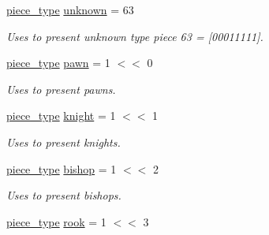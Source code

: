 \begin{DoxyCompactItemize}
\item 
\hypertarget{namespaceChEngn_a538ef441c024a7e5d4c1dedb5e03fc21}{
\hyperlink{namespaceChEngn_a2a35c185f259757a78e937575b8ed483}{piece\_\-type} \hyperlink{namespaceChEngn_a538ef441c024a7e5d4c1dedb5e03fc21}{unknown} = 63}
\label{namespaceChEngn_a538ef441c024a7e5d4c1dedb5e03fc21}

\begin{DoxyCompactList}\small\item\em Uses to present unknown type piece 63 = \mbox{[}00011111\mbox{]}. \item\end{DoxyCompactList}\item 
\hypertarget{namespaceChEngn_af4781da8088272ec86e35be681dde106}{
\hyperlink{namespaceChEngn_a2a35c185f259757a78e937575b8ed483}{piece\_\-type} \hyperlink{namespaceChEngn_af4781da8088272ec86e35be681dde106}{pawn} = 1 $<$$<$ 0}
\label{namespaceChEngn_af4781da8088272ec86e35be681dde106}

\begin{DoxyCompactList}\small\item\em Uses to present pawns. \item\end{DoxyCompactList}\item 
\hypertarget{namespaceChEngn_ab167075161c66436eef6d7f02507c115}{
\hyperlink{namespaceChEngn_a2a35c185f259757a78e937575b8ed483}{piece\_\-type} \hyperlink{namespaceChEngn_ab167075161c66436eef6d7f02507c115}{knight} = 1 $<$$<$ 1}
\label{namespaceChEngn_ab167075161c66436eef6d7f02507c115}

\begin{DoxyCompactList}\small\item\em Uses to present knights. \item\end{DoxyCompactList}\item 
\hypertarget{namespaceChEngn_ad9410a19494f941d06ea404edf4900b0}{
\hyperlink{namespaceChEngn_a2a35c185f259757a78e937575b8ed483}{piece\_\-type} \hyperlink{namespaceChEngn_ad9410a19494f941d06ea404edf4900b0}{bishop} = 1 $<$$<$ 2}
\label{namespaceChEngn_ad9410a19494f941d06ea404edf4900b0}

\begin{DoxyCompactList}\small\item\em Uses to present bishops. \item\end{DoxyCompactList}\item 
\hypertarget{namespaceChEngn_a485787ab76caf7a61a77118fcdfd113d}{
\hyperlink{namespaceChEngn_a2a35c185f259757a78e937575b8ed483}{piece\_\-type} \hyperlink{namespaceChEngn_a485787ab76caf7a61a77118fcdfd113d}{rook} = 1 $<$$<$ 3}
\label{namespaceChEngn_a485787ab76caf7a61a77118fcdfd113d}


\end{DoxyCompactItemize}
